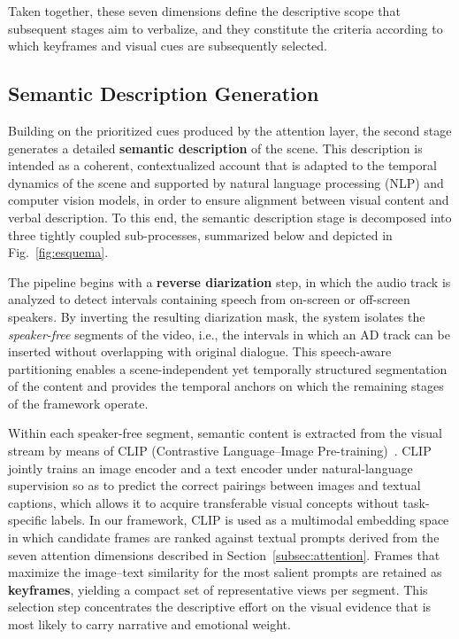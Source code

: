 \documentclass[pdflatex,iicol,sn-mathphys-num]{sn-jnl}%
\theoremstyle{thmstyleone}%
\theoremstyle{thmstyletwo}%
\theoremstyle{thmstylethree}%
\begin{document}
Taken together, these seven dimensions define the descriptive scope that subsequent stages aim to verbalize, and they constitute the criteria according to which keyframes and visual cues are subsequently selected.

\subsection{Semantic Description Generation}
\label{subsec:semantic}

Building on the prioritized cues produced by the attention layer, the second stage generates a detailed \textbf{semantic description} of the scene. This description is intended as a coherent, contextualized account that is adapted to the temporal dynamics of the scene and supported by natural language processing (NLP) and computer vision models, in order to ensure alignment between visual content and verbal description. To this end, the semantic description stage is decomposed into three tightly coupled sub-processes, summarized below and depicted in Fig.~\ref{fig:esquema}.

The pipeline begins with a \textbf{reverse diarization} step, in which the audio track is analyzed to detect intervals containing speech from on-screen or off-screen speakers. By inverting the resulting diarization mask, the system isolates the \emph{speaker-free} segments of the video, i.e., the intervals in which an AD track can be inserted without overlapping with original dialogue. This speech-aware partitioning enables a scene-independent yet temporally structured segmentation of the content and provides the temporal anchors on which the remaining stages of the framework operate.

Within each speaker-free segment, semantic content is extracted from the visual stream by means of CLIP (Contrastive Language–Image Pre-training)~\cite{Radford2021}. CLIP jointly trains an image encoder and a text encoder under natural-language supervision so as to predict the correct pairings between images and textual captions, which allows it to acquire transferable visual concepts without task-specific labels. In our framework, CLIP is used as a multimodal embedding space in which candidate frames are ranked against textual prompts derived from the seven attention dimensions described in Section~\ref{subsec:attention}. Frames that maximize the image–text similarity for the most salient prompts are retained as \textbf{keyframes}, yielding a compact set of representative views per segment. This selection step concentrates the descriptive effort on the visual evidence that is most likely to carry narrative and emotional weight.
\end{document}
